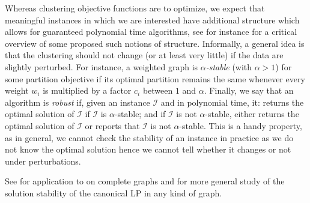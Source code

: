 Whereas clustering objective functions are \NPh{} to optimize, we expect that meaningful instances
in which we are interested have additional structure which allows for guaranteed polynomial time
algorithms, see for instance \autocite{clusteringFeasibility15} for a critical overview of some
proposed such notions of structure. Informally, a general idea is that the clustering should not
change (or at least very little) if the data are slightly perturbed. For instance, a weighted graph
is \emph{$\alpha$-stable} (with $\alpha>1$) for some partition objective if its optimal partition
remains the same whenever every weight $w_i$ is multiplied by a factor $c_i$ between $1$ and
$\alpha$.
Finally, we say that an algorithm is \emph{robust} if, given an instance $\mathcal{I}$ and
in polynomial time, it: returns the optimal solution of $\mathcal{I}$ if $\mathcal{I}$ is
$\alpha$-stable; and if $\mathcal{I}$ is not $\alpha$-stable, either returns the optimal solution of
$\mathcal{I}$ or reports that $\mathcal{I}$ is not $\alpha$-stable. This is a handy property, as in
general, we cannot check the stability of an instance in practice as we do not know the optimal
solution hence we cannot tell whether it changes or not under perturbations.

See \autocite{StableCC09} for application to \mind{} on complete graphs and \autocite{StableLP09}
for more general study of the solution stability of the canonical \mind{} LP in any kind of graph.

